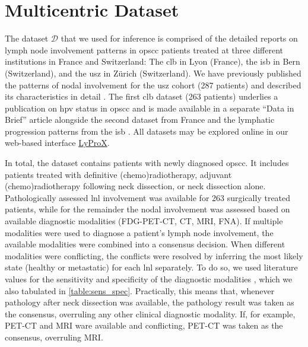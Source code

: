 \documentclass[twocolumn]{article}
\begin{document}
\section{Multicentric Dataset}
\label{sec:data}

The dataset $\boldsymbol{\mathcal{D}}$ that we used for inference is comprised of the detailed reports on lymph node involvement patterns in \gls{opscc} patients treated at three different institutions in France and Switzerland: The \gls{clb} in Lyon (France), the \gls{isb} in Bern (Switzerland), and the \gls{usz} in Zürich (Switzerland). We have previously published the patterns of nodal involvement for the \gls{usz} cohort (287 patients) \cite{ludwig_dataset_2022} and described its characteristics in detail \cite{ludwig_detailed_2022}. The first \gls{clb} dataset (263 patients) underlies a publication on \gls{hpv} status in \gls{opscc} \cite{bauwens_prevalence_2021} and is made available in a separate ``Data in Brief'' article alongside the second dataset from France and the lymphatic progression patterns from the \gls{isb} \cite{ludwig_multi-centric_2023}. All datasets may be explored online in our web-based interface \href{https://lyprox.org}{LyProX}.

In total, the dataset contains patients with newly diagnosed \gls{opscc}. It includes patients treated with definitive (chemo)radiotherapy, adjuvant (chemo)radiotherapy following neck dissection, or neck dissection alone. Pathologically assessed \gls{lnl} involvement was available for 263 surgically treated patients, while for the remainder the nodal involvement was assessed based on available diagnostic modalities (FDG-PET-CT, CT, MRI, FNA). If multiple modalities were used to diagnose a patient's lymph node involvement, the available modalities were combined into a consensus decision. When different modalities were conflicting, the conflicts were resolved by inferring the most likely state (healthy or metastatic) for each \gls{lnl} separately. To do so, we used literature values for the sensitivity and specificity of the diagnostic modalities \cite{de_bondt_detection_2007,kyzas_18f-fluorodeoxyglucose_2008}, which we also tabulated in \cref{table:sens_spec}. Practically, this means that, whenever pathology after neck dissection was available, the pathology result was taken as the consensus, overruling any other clinical diagnostic modality. If, for example, PET-CT and MRI ware available and conflicting, PET-CT was taken as the consensus, overruling MRI.
\end{document}
